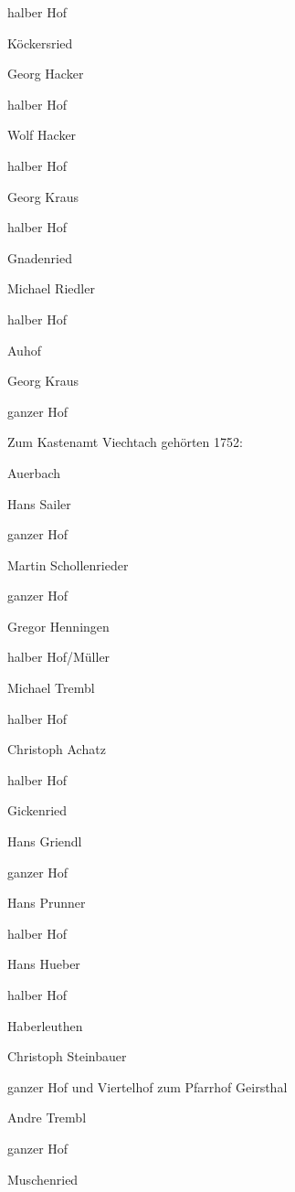 \documentclass[12pt,a4pager]{book}
\begin{document}
halber Hof

Köckersried

Georg Hacker

halber Hof



Wolf Hacker

halber Hof



Georg Kraus

halber Hof

Gnadenried

Michael Riedler

halber Hof

Auhof

Georg Kraus

ganzer Hof



Zum Kastenamt Viechtach gehörten 1752:



 Auerbach

Hans Sailer

ganzer Hof



Martin Schollenrieder

ganzer Hof



Gregor Henningen

halber Hof/Müller



Michael Trembl

halber Hof



Christoph Achatz

halber Hof

Gickenried

Hans Griendl

ganzer Hof



Hans Prunner

halber Hof



Hans Hueber

halber Hof

Haberleuthen

Christoph Steinbauer

ganzer Hof und Viertelhof zum Pfarrhof Geirsthal



Andre Trembl

ganzer Hof

Muschenried
\end{document}
